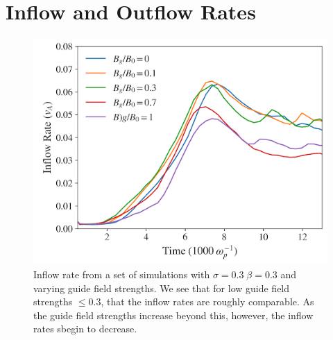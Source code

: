 \documentclass[iop,twocolappendix]{emulateapj}
\begin{document}
\section{Inflow and Outflow Rates}

\begin{figure}[!h]
	\includegraphics[width=\linewidth]{sig_3_highbeta_inflows.png}
	\caption{Inflow rate from a set of simulations with $\sigma=0.3 \; \beta=0.3$ and varying guide field strengths.  We see that for low guide field strengths $\leq 0.3$, that the inflow rates are roughly comparable.  As the guide field strengths increase beyond this, however, the inflow rates sbegin to decrease.
	}
	\label{sig.3_highbeta_inflows}
\end{figure}
\end{document}
